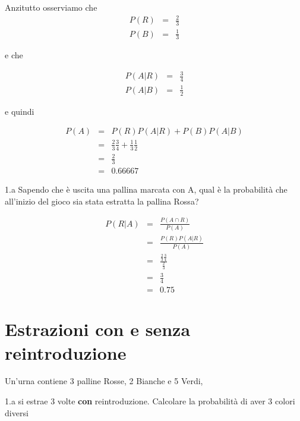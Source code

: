 \documentclass[
  11pt,
]{book}
\theoremstyle{mytheoremstyle}
\theoremstyle{mydefstyle}
\newenvironment{sol}
  {
  \begin{tcolorbox}[enhanced,breakable,arc=0.1mm,boxrule=1pt,colback=white,colframe=iblue,
  title=\bf \fontfamily{lmss}\selectfont \hspace{.5 cm} Soluzione,drop fuzzy shadow]

}{
\end{tcolorbox}
  }
\begin{document}
\begin{sol}
Anzitutto osserviamo che
\begin{eqnarray*}
  P(R) &=&  \frac23\\
  P(B) &=& \frac13
\end{eqnarray*}

e che

\begin{eqnarray*}
  P(A|R) &=&  \frac34\\
  P(A|B) &=& \frac12
\end{eqnarray*}

e quindi

\begin{eqnarray*}
  P(A) &=&  P(R)P(A|R)+P(B)P(A|B)\\
   &=& \frac23\frac34+\frac13\frac12\\
   &=& \frac23\\
   &=& 0.66667
\end{eqnarray*}

\end{sol}

1.a Sapendo che è uscita una pallina marcata con A, qual è la probabilità che all'inizio del gioco sia stata estratta la pallina Rossa?

\begin{sol}
\begin{eqnarray*}
  P(R|A)  &=&  \frac{P(A\cap R)}{P(A)}\\
          &=&  \frac{P(R)P(A|R)}{P(A)}\\
          &=&  \frac{\frac23\frac34}{\frac23}\\
          &=&  \frac34\\
          &=& 0.75
\end{eqnarray*}

\end{sol}

\section{Estrazioni con e senza reintroduzione}\label{estrazioni-con-e-senza-reintroduzione}

Un'urna contiene 3 palline Rosse, 2 Bianche e 5 Verdi,

1.a si estrae 3 volte \textbf{con} reintroduzione.
Calcolare la probabilità di aver 3 colori diversi
\end{document}
